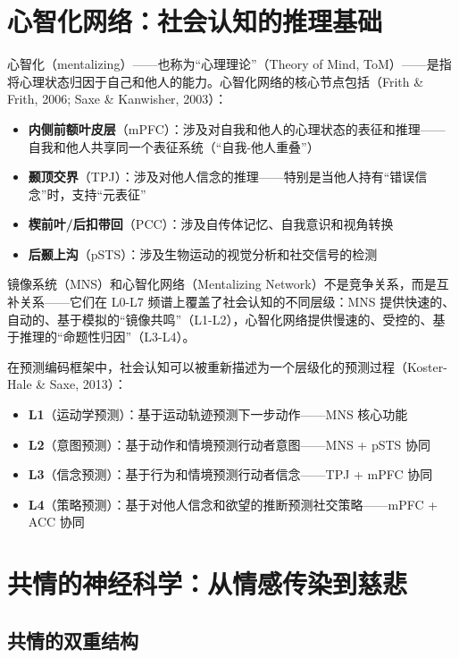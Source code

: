 \documentclass[UTF8,12pt,a4paper]{ctexart}
\begin{document}
\section{心智化网络：社会认知的推理基础}

心智化（mentalizing）——也称为``心理理论''（Theory of Mind, ToM）——是指将心理状态归因于自己和他人的能力。心智化网络的核心节点包括（Frith \& Frith, 2006; Saxe \& Kanwisher, 2003）：

\begin{itemize}[nosep]
    \item \textbf{内侧前额叶皮层}（mPFC）：涉及对自我和他人的心理状态的表征和推理——自我和他人共享同一个表征系统（``自我-他人重叠''）
    \item \textbf{颞顶交界}（TPJ）：涉及对他人信念的推理——特别是当他人持有``错误信念''时，支持``元表征''
    \item \textbf{楔前叶/后扣带回}（PCC）：涉及自传体记忆、自我意识和视角转换
    \item \textbf{后颞上沟}（pSTS）：涉及生物运动的视觉分析和社交信号的检测
\end{itemize}

镜像系统（MNS）和心智化网络（Mentalizing Network）不是竞争关系，而是互补关系——它们在 L0-L7 频谱上覆盖了社会认知的不同层级：MNS 提供快速的、自动的、基于模拟的``镜像共鸣''（L1-L2），心智化网络提供慢速的、受控的、基于推理的``命题性归因''（L3-L4）。

在预测编码框架中，社会认知可以被重新描述为一个层级化的预测过程（Koster-Hale \& Saxe, 2013）：
\begin{itemize}[nosep]
    \item \textbf{L1}（运动学预测）：基于运动轨迹预测下一步动作——MNS 核心功能
    \item \textbf{L2}（意图预测）：基于动作和情境预测行动者意图——MNS + pSTS 协同
    \item \textbf{L3}（信念预测）：基于行为和情境预测行动者信念——TPJ + mPFC 协同
    \item \textbf{L4}（策略预测）：基于对他人信念和欲望的推断预测社交策略——mPFC + ACC 协同
\end{itemize}

\section{共情的神经科学：从情感传染到慈悲}

\subsection{共情的双重结构}
\end{document}
